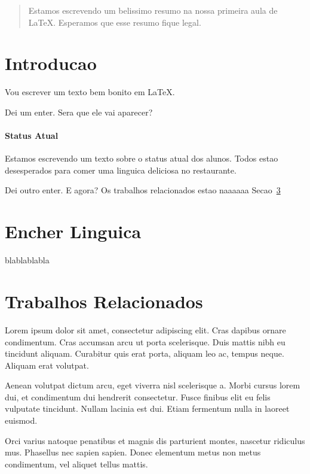 \documentclass[12pt]{article}
\begin{document}
	
	\begin{abstract}
		Estamos escrevendo um belissimo resumo na nossa primeira aula de LaTeX. Esperamos que esse resumo fique legal.
	\end{abstract}
	
	\section{Introducao}
		Vou escrever um texto bem bonito em LaTeX.
		
		Dei um enter. Sera que ele vai aparecer?
	
		\paragraph{Status Atual}
			Estamos escrevendo um texto sobre o status atual dos alunos. Todos estao desesperados para comer uma linguica deliciosa no restaurante.
			
		Dei outro enter. E agora? Os trabalhos relacionados estao naaaaaa Secao~\ref{trab_rel} 
		
	\section{Encher Linguica}
		blablablabla
			
	\section{Trabalhos Relacionados}
		\label{trab_rel}
		
		Lorem ipsum dolor sit amet, consectetur adipiscing elit. Cras dapibus ornare condimentum. Cras accumsan arcu ut porta scelerisque. Duis mattis nibh eu tincidunt aliquam. Curabitur quis erat porta, aliquam leo ac, tempus neque. Aliquam erat volutpat. 
		
		Aenean volutpat dictum arcu, eget viverra nisl scelerisque a. Morbi cursus lorem dui, et condimentum dui hendrerit consectetur. Fusce finibus elit eu felis vulputate tincidunt. Nullam lacinia est dui. Etiam fermentum nulla in laoreet euismod. 
		
		Orci varius natoque penatibus et magnis dis parturient montes, nascetur ridiculus mus. Phasellus nec sapien sapien. Donec elementum metus non metus condimentum, vel aliquet tellus mattis.		
		
\end{document}
